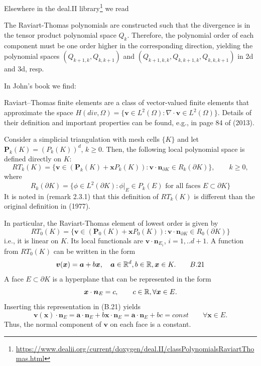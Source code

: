 Elsewhere in the deal.II library\footnote{\url{https://www.dealii.org/current/doxygen/deal.II/classPolynomialsRaviartThomas.html}} we read
\begin{displayquote}
{\color{darkgray}
The Raviart-Thomas polynomials are constructed such that the divergence is 
in the tensor product polynomial space $Q_k$. Therefore, the polynomial order of each component 
must be one order higher in the corresponding direction, yielding the polynomial spaces 
$(Q_{k+1,k}, Q_{k,k+1})$ and $(Q_{k+1,k,k}, Q_{k,k+1,k}, Q_{k,k,k+1})$ in 2d and 3d, resp. 
}
\end{displayquote}


In John's book \cite{john16} we find:
\begin{displayquote}
{\color{darkgray}
Raviart–Thomas finite elements are a class of vector-valued finite elements that approximate the space
$H(div,\Omega)=\{ {\bm v} \in L^2(\Omega): \nabla \cdot {\bm v} \in L^2(\Omega)  \}$.
Details of their definition and important properties can be
found, e.g., in page 84 of \textcite{bobf13} (2013).

Consider a simplicial triangulation with mesh cells $\{K\}$ and let ${\bm P}_k(K)=(P_k(K))^d$, $k\ge 0$.
Then, the following local polynomial space is defined directly on $K$:
\[
RT_k(K)=\{ {\bm v} \in ({\bm P}_k(K) + {\bm x} P_k(K)) : {\bm v}\cdot{\bm n}_{\partial K} \in R_k(\partial K)\},
\qquad k\ge 0,
\]
where
\[
R_k(\partial K)=\{ \phi \in L^2(\partial K): \phi|_E\in P_k(E) \text{ for all faces } E\subset \partial K \}
\]
It is noted in \textcite{bobf13} (remark 2.3.1) that this definition of $RT_k(K)$
is different than the original definition in \textcite{rath77} (1977).

In particular, the Raviart-Thomas element of lowest order is given by
\[
RT_0(K)=\{ {\bm v} \in ({\bm P}_0(K)+{\bm x} P_0(K)) : {\bm v} \cdot {\bm n}_{\partial K} \in R_0(\partial K)  \}
\]
i.e., it is linear on $K$. Its local functionals are ${\bm v} \cdot {\bm n}_{E_i}$, $i=1,..d+1$. 
A function from $RT_0(K)$ can be written in the form
\[
{\bm v}({\bm x}) = {\bm a} + b {\bm x}, \quad {\bm a}\in {\mathbb{R}}^d, b\in {\mathbb{R}}, {\bm x}\in K. \qquad B.21
\]
A face $E\subset \partial K$ is a hyperplane that can be represented in the form
\[
{\bm x}\cdot {\bm n}_E = c, \qquad c\in {\mathbb{R}}, \forall {\bm x} \in E.
\]
Inserting this representation in (B.21) yields
\[
{\bm v}({\bm x})\cdot {\bm n}_E = {\bm a}\cdot {\bm n}_E + b {\bm x} \cdot {\bm n}_E = {\bm a}\cdot {\bm n}_E + bc =const
\qquad \forall {\bm x}\in E.
\]
Thus, the normal component of ${\bm v}$ on each face is a constant.

}
\end{displayquote}



